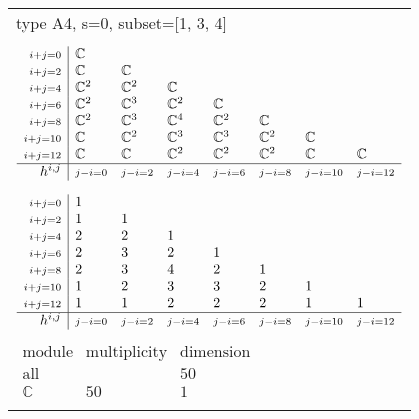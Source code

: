 \documentclass[crop,border=2mm]{standalone}
\begin{document}
\begin{tabular}{l}
{\huge type A4, s=0, subset=[1, 3, 4]}\\ \\


$\displaystyle
\begin{array}{r|l l l l l l l}
	{\scriptstyle i+j=0}&\mathbb{C}&&&&&&\\
	{\scriptstyle i+j=2}&\mathbb{C}&\mathbb{C}&&&&&\\
	{\scriptstyle i+j=4}&\mathbb{C}^{2}&\mathbb{C}^{2}&\mathbb{C}&&&&\\
	{\scriptstyle i+j=6}&\mathbb{C}^{2}&\mathbb{C}^{3}&\mathbb{C}^{2}&\mathbb{C}&&&\\
	{\scriptstyle i+j=8}&\mathbb{C}^{2}&\mathbb{C}^{3}&\mathbb{C}^{4}&\mathbb{C}^{2}&\mathbb{C}&&\\
	{\scriptstyle i+j=10}&\mathbb{C}&\mathbb{C}^{2}&\mathbb{C}^{3}&\mathbb{C}^{3}&\mathbb{C}^{2}&\mathbb{C}&\\
	{\scriptstyle i+j=12}&\mathbb{C}&\mathbb{C}&\mathbb{C}^{2}&\mathbb{C}^{2}&\mathbb{C}^{2}&\mathbb{C}&\mathbb{C}\\
	\hline h^{i,j}&{\scriptstyle j-i=0}&{\scriptstyle j-i=2}&{\scriptstyle j-i=4}&{\scriptstyle j-i=6}&{\scriptstyle j-i=8}&{\scriptstyle j-i=10}&{\scriptstyle j-i=12}
\end{array}
$ \\ \\


$\displaystyle
\begin{array}{r|l l l l l l l}
	{\scriptstyle i+j=0}&1&&&&&&\\
	{\scriptstyle i+j=2}&1&1&&&&&\\
	{\scriptstyle i+j=4}&2&2&1&&&&\\
	{\scriptstyle i+j=6}&2&3&2&1&&&\\
	{\scriptstyle i+j=8}&2&3&4&2&1&&\\
	{\scriptstyle i+j=10}&1&2&3&3&2&1&\\
	{\scriptstyle i+j=12}&1&1&2&2&2&1&1\\
	\hline h^{i,j}&{\scriptstyle j-i=0}&{\scriptstyle j-i=2}&{\scriptstyle j-i=4}&{\scriptstyle j-i=6}&{\scriptstyle j-i=8}&{\scriptstyle j-i=10}&{\scriptstyle j-i=12}
\end{array}
$ \\ \\


$\displaystyle
\begin{array}{rll}
	\text{module}&\text{multiplicity}&\text{dimension} \\ \hline \text{all}&&50 \\
	\mathbb{C}&50&1
\end{array}
$ \\ \\

\end{tabular}
\end{document}
